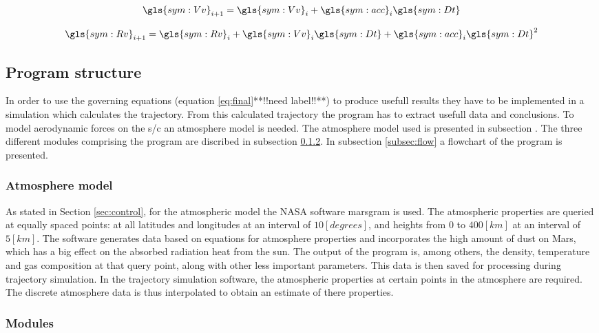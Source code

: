 \begin{equation} \label{eq:Vi}
\gls{sym:Vv}_{i+1} = \gls{sym:Vv}_i + \gls{sym:acc}_i \gls{sym:Dt}
\end{equation}

\begin{equation} \label{eq:Ri}
\gls{sym:Rv}_{i+1} = \gls{sym:Rv}_i + \gls{sym:Vv}_i \gls{sym:Dt} + \gls{sym:acc}_i \gls{sym:Dt}^2
\end{equation}

\subsection{Program structure}\label{sec:prog_struct}

In order to use the governing equations (equation \ref{eq:final}**!!need label!!**) to produce usefull results they have to be implemented in a simulation which calculates the trajectory. From this calculated trajectory the program has to extract usefull data and conclusions. To model aerodynamic forces on the s/c an atmosphere model is needed. The atmosphere model used is presented in subsection \label{subsec:atmos}. The three different modules comprising the program are discribed in subsection \ref{subsec:modules}. In subsection \ref{subsec:flow} a flowchart of the program is presented.

\subsubsection{Atmosphere model}\label{subsec:atmos}
As stated in Section \ref{sec:control}, for the atmospheric model the NASA software \gls{marsgram} is used. The atmospheric properties are queried at equally spaced points: at all latitudes and longitudes at an interval of $10 [degrees]$, and heights from $0$ to $400 [km]$ at an interval of $5 [km]$. The software generates data based on equations for atmosphere properties and incorporates the high amount of dust on Mars, which has a big effect on the absorbed radiation heat from the sun. The output of the program is, among others, the density, temperature and gas composition at that query point, along with other less important parameters. \cite{Justus2001}
This data is then saved for processing during trajectory simulation. In the trajectory simulation software, the atmospheric properties at certain points in the atmosphere are required. The discrete atmosphere data is thus interpolated to obtain an estimate of there properties. 

\subsubsection{Modules} \label{subsec:modules}

